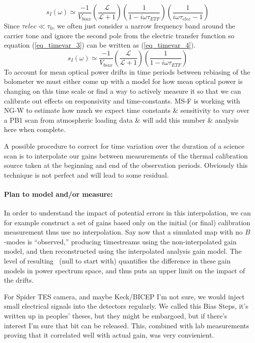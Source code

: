 \begin{equation}
\label{eq_timevar_3}
s_I(\omega) \simeq \frac{-1}{V_{biax}}\left(\frac{\mathcal{L}}{\mathcal{L}+1}\right)\left(\frac{1}{1-i\omega\tau_{ETF}}\right)\left(\frac{1}{i\omega\tau_{elec}-1}\right)
\end{equation}
Since $\tau{elec} \ll \tau_0$, we often just consider a narrow frequency band around the carrier tone and ignore the second pole from the electric transfer function so equation (\ref{eq_timevar_3}) can be written as (\ref{eq_timevar_4}).
\begin{equation}
\label{eq_timevar_4}
s_I(\omega) \simeq \frac{-1}{V_{biax}}\left(\frac{\mathcal{L}}{\mathcal{L}+1}\right)\left(\frac{1}{1-i\omega\tau_{ETF}}\right)
\end{equation}
To account for mean optical power drifts in time periods between rebiasing of the bolometer we must either come up with a model for how mean optical power is changing on this time scale or find a way to actively measure it so that we can calibrate out effects on responsivity and time-constants. MS-F is working with NG-W to estimate how much we expect time constants \& sensitivity to vary over a PB1 scan from atmospheric loading data \& will add this number \& analysis here when complete.

A possible procedure to correct for time variation over the duration of a science scan is to interpolate our gains between measurements of the thermal calibration source taken at the beginning and end of the observation periods.
Obviously this technique is not perfect and will lead to some residual.

\paragraph{Plan to model and/or measure:}
In order to understand the impact of potential errors in this interpolation, we can for example construct a set of gains based only on the initial (or final) calibration measurement thus use no interpolation.
Say now that a simulated map with no $B$-modes is ``observed,'' producing timestreams using the non-interpolated gain model, and then reconstructed using the interpolated analysis gain model. 
The level of resulting \clbb\ (null to start with) quantifies the difference in these gain models in power spectrum space, and thus puts an upper limit on the impact of the drifts.

For Spider TES camera, and maybe Keck/BICEP I'm not sure, we would inject small electrical signals into the detectors regularly. We called this Bias Steps, it's written up in peoples' theses, but they might be embargoed, but if there's interest I'm sure that bit can be released. This, combined with lab measurements proving that it correlated well with actual gain, was very convienient.

